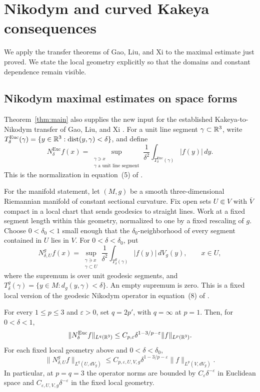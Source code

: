 \section{Nikodym and curved Kakeya consequences}\label{sec:consequences}

We apply the transfer theorems of Gao, Liu, and Xi to the maximal
estimate just proved. We state the local geometry explicitly so that
the domains and constant dependence remain visible.

\subsection{Nikodym maximal estimates on space forms}

Theorem~\ref{thm:main} also supplies the new input for the established
Kakeya-to-Nikodym transfer of Gao, Liu, and Xi
\citep[Section~2.2, Proposition~2.3]{GLX2025}. For a unit line segment
\(\gamma\subset\mathbb R^3\), write
\(T_\delta^{\mathrm{Euc}}(\gamma)=
\{y\in\mathbb R^3:\operatorname{dist}(y,\gamma)<\delta\}\), and define
\[
N_\delta^{\mathrm{Euc}}f(x)=
\sup_{\substack{\gamma\ni x\\ \gamma\text{ a unit line segment}}}
\frac1{\delta^2}\int_{T_\delta^{\mathrm{Euc}}(\gamma)}|f(y)|\,dy .
\]
This is the normalization in equation~(5) of \citet{GLX2025}.

For the manifold statement, let \((M,g)\) be a smooth three-dimensional
Riemannian manifold of constant sectional curvature. Fix open sets
\(U\Subset V\) with \(\overline V\) compact in a local chart that sends
geodesics to straight lines. Work at a fixed segment length within this
geometry, normalized to one by a fixed rescaling of \(g\). Choose
\(0<\delta_0<1\) small enough that the \(\delta_0\)-neighborhood of
every segment contained in \(U\) lies in \(V\). For \(0<\delta<\delta_0\),
put
\[
N_{\delta,U}^{g}f(x)=
\sup_{\substack{\gamma\ni x\\ \gamma\subset U}}
\frac1{\delta^2}\int_{T_\delta^{g}(\gamma)}|f(y)|\,dV_g(y),
\qquad x\in U,
\]
where the supremum is over unit geodesic segments, and
\(T_\delta^{g}(\gamma)=\{y\in M:d_g(y,\gamma)<\delta\}\).
An empty supremum is zero. This is a fixed local version of the
geodesic Nikodym operator in equation~(8) of \citet{GLX2025}.

\begin{corollary}
\label{cor:nikodym-space-forms}
For every \(1\le p\le3\) and \(\varepsilon>0\), set \(q=2p'\), with
\(q=\infty\) at \(p=1\). Then, for \(0<\delta<1\),
\[
\|N_\delta^{\mathrm{Euc}}f\|_{L^q(\mathbb R^3)}
\le C_{p,\varepsilon}\delta^{1-3/p-\varepsilon}
   \|f\|_{L^p(\mathbb R^3)}.
\]
For each fixed local geometry above and \(0<\delta<\delta_0\),
\[
\|N_{\delta,U}^{g}f\|_{L^q(U,dV_g)}
\le C_{p,\varepsilon,U,V,g}\delta^{1-3/p-\varepsilon}
   \|f\|_{L^p(V,dV_g)}.
\]
In particular, at \(p=q=3\) the operator norms are bounded by
\(C_\varepsilon\delta^{-\varepsilon}\) in Euclidean space and
\(C_{\varepsilon,U,V,g}\delta^{-\varepsilon}\) in the fixed local
geometry.
\end{corollary}

